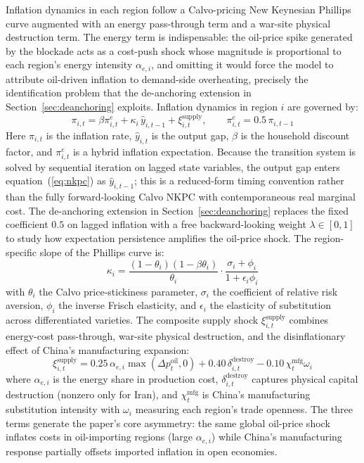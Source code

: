 \documentclass[12pt]{article}
\begin{document}
Inflation dynamics in each region follow a Calvo-pricing New Keynesian Phillips curve augmented with an energy pass-through term and a war-site physical destruction term. The energy term is indispensable: the oil-price spike generated by the blockade acts as a cost-push shock whose magnitude is proportional to each region's energy intensity $\alpha_{e,i}$, and omitting it would force the model to attribute oil-driven inflation to demand-side overheating, precisely the identification problem that the de-anchoring extension in Section~\ref{sec:deanchoring} exploits. Inflation dynamics in region $i$ are governed by:
\begin{equation}
\pi_{i,t} = \beta \pi^e_{i,t} + \kappa_i \, \hat{y}_{i,t-1} + \xi^{\text{supply}}_{i,t}, 
\qquad \pi^e_{i,t}=0.5\,\pi_{i,t-1}
\label{eq:nkpc}
\end{equation}
Here $\pi_{i,t}$ is the inflation rate, $\hat{y}_{i,t}$ is the output gap, $\beta$ is the household discount factor, and $\pi^e_{i,t}$ is a hybrid inflation expectation. Because the transition system is solved by sequential iteration on lagged state variables, the output gap enters equation~(\ref{eq:nkpc}) as $\hat{y}_{i,t-1}$; this is a reduced-form timing convention rather than the fully forward-looking Calvo NKPC with contemporaneous real marginal cost. The de-anchoring extension in Section~\ref{sec:deanchoring} replaces the fixed coefficient $0.5$ on lagged inflation with a free backward-looking weight $\lambda \in [0,1]$ to study how expectation persistence amplifies the oil-price shock. The region-specific slope of the Phillips curve is:
\begin{equation}
\kappa_i = \frac{(1-\theta_i)(1-\beta\theta_i)}{\theta_i} \cdot \frac{\sigma_i + \phi_i}{1 + \epsilon_i \phi_i}
\label{eq:kappa}
\end{equation}
with $\theta_i$ the Calvo price-stickiness parameter, $\sigma_i$ the coefficient of relative risk aversion, $\phi_i$ the inverse Frisch elasticity, and $\epsilon_i$ the elasticity of substitution across differentiated varieties. The composite supply shock $\xi^{\text{supply}}_{i,t}$ combines energy-cost pass-through, war-site physical destruction, and the disinflationary effect of China's manufacturing expansion:
\begin{equation}
\xi^{\text{supply}}_{i,t} = 0.25\,\alpha_{e,i} \max(\Delta p^{\text{oil}}_t, 0) + 0.40\,\delta^{\text{destroy}}_{i,t} - 0.10\,\chi^{\text{mfg}}_t \omega_i
\label{eq:supply_shock}
\end{equation}
where $\alpha_{e,i}$ is the energy share in production cost, $\delta^{\text{destroy}}_{i,t}$ captures physical capital destruction (nonzero only for Iran), and $\chi^{\text{mfg}}_t$ is China's manufacturing substitution intensity with $\omega_i$ measuring each region's trade openness. The three terms generate the paper's core asymmetry: the same global oil-price shock inflates costs in oil-importing regions (large $\alpha_{e,i}$) while China's manufacturing response partially offsets imported inflation in open economies.
\end{document}
